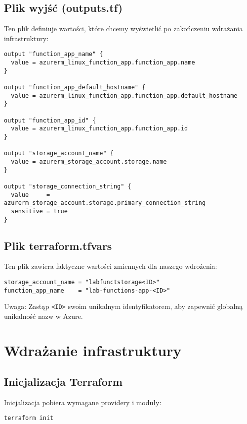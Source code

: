 \documentclass{article}
\begin{document}
\subsection{Plik wyjść (outputs.tf)}

Ten plik definiuje wartości, które chcemy wyświetlić po zakończeniu wdrażania infrastruktury:

\begin{lstlisting}[]
output "function_app_name" {
  value = azurerm_linux_function_app.function_app.name
}

output "function_app_default_hostname" {
  value = azurerm_linux_function_app.function_app.default_hostname
}

output "function_app_id" {
  value = azurerm_linux_function_app.function_app.id
}

output "storage_account_name" {
  value = azurerm_storage_account.storage.name
}

output "storage_connection_string" {
  value     = azurerm_storage_account.storage.primary_connection_string
  sensitive = true
}
\end{lstlisting}

\subsection{Plik terraform.tfvars}

Ten plik zawiera faktyczne wartości zmiennych dla naszego wdrożenia:

\begin{lstlisting}[]
storage_account_name = "labfunctstorage<ID>"
function_app_name    = "lab-functions-app-<ID>"
\end{lstlisting}

Uwaga: Zastąp \texttt{<ID>} swoim unikalnym identyfikatorem, aby zapewnić globalną unikalność nazw w Azure.

\section{Wdrażanie infrastruktury}

\subsection{Inicjalizacja Terraform}

Inicjalizacja pobiera wymagane providery i moduły:

\begin{lstlisting}[language=bash]
terraform init
\end{lstlisting}
\end{document}
